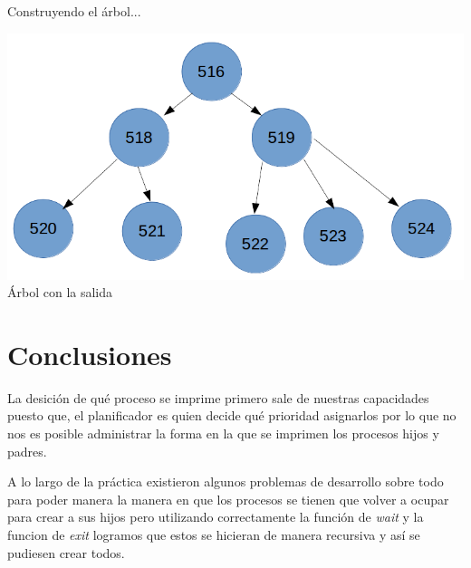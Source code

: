 \documentclass[10pt,a4paper]{article}
\begin{document}
\begin{flushleft}
Construyendo el árbol...
\end{flushleft}

\begin{center}
\includegraphics[scale=0.3]{arbol.png} \\
Árbol con la salida
\end{center}

\section{Conclusiones}

\begin{flushleft}
La desición de qué proceso se imprime primero sale de nuestras capacidades puesto que, el planificador es quien decide qué prioridad asignarlos por lo que no nos es posible administrar la forma en la que se imprimen los procesos hijos y padres.
\end{flushleft}

\begin{flushleft}
A lo largo de la práctica existieron algunos problemas de desarrollo sobre todo para poder manera la manera en que los procesos se tienen que volver a ocupar para crear a sus hijos pero utilizando correctamente la función de \textit{wait} y la funcion de \textit{exit} logramos que estos se hicieran de manera recursiva y así se pudiesen crear todos.
\end{flushleft}
\end{document}

